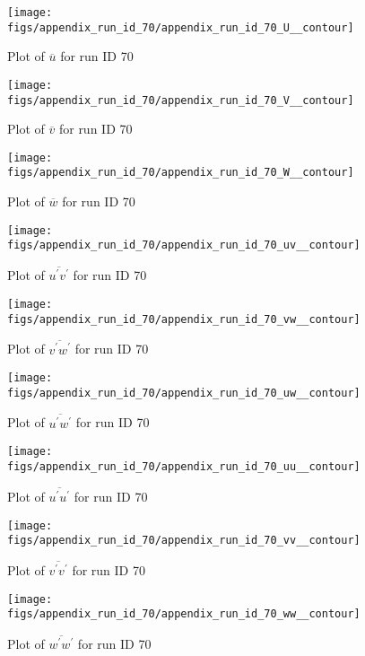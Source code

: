 \begin{figure}[H]
\centering
\texttt{[image: figs/appendix\_run\_id\_70/appendix\_run\_id\_70\_U\_\_contour]}
\caption{Plot of $\overline{u}$ for run ID 70}
\label{fig:appendix_run_id_70_U__contour}
\end{figure}


\begin{figure}[H]
\centering
\texttt{[image: figs/appendix\_run\_id\_70/appendix\_run\_id\_70\_V\_\_contour]}
\caption{Plot of $\overline{v}$ for run ID 70}
\label{fig:appendix_run_id_70_V__contour}
\end{figure}


\begin{figure}[H]
\centering
\texttt{[image: figs/appendix\_run\_id\_70/appendix\_run\_id\_70\_W\_\_contour]}
\caption{Plot of $\overline{w}$ for run ID 70}
\label{fig:appendix_run_id_70_W__contour}
\end{figure}


\begin{figure}[H]
\centering
\texttt{[image: figs/appendix\_run\_id\_70/appendix\_run\_id\_70\_uv\_\_contour]}
\caption{Plot of $\overline{u^\prime v^\prime}$ for run ID 70}
\label{fig:appendix_run_id_70_uv__contour}
\end{figure}


\begin{figure}[H]
\centering
\texttt{[image: figs/appendix\_run\_id\_70/appendix\_run\_id\_70\_vw\_\_contour]}
\caption{Plot of $\overline{v^\prime w^\prime}$ for run ID 70}
\label{fig:appendix_run_id_70_vw__contour}
\end{figure}


\begin{figure}[H]
\centering
\texttt{[image: figs/appendix\_run\_id\_70/appendix\_run\_id\_70\_uw\_\_contour]}
\caption{Plot of $\overline{u^\prime w^\prime}$ for run ID 70}
\label{fig:appendix_run_id_70_uw__contour}
\end{figure}


\begin{figure}[H]
\centering
\texttt{[image: figs/appendix\_run\_id\_70/appendix\_run\_id\_70\_uu\_\_contour]}
\caption{Plot of $\overline{u^\prime u^\prime}$ for run ID 70}
\label{fig:appendix_run_id_70_uu__contour}
\end{figure}


\begin{figure}[H]
\centering
\texttt{[image: figs/appendix\_run\_id\_70/appendix\_run\_id\_70\_vv\_\_contour]}
\caption{Plot of $\overline{v^\prime v^\prime}$ for run ID 70}
\label{fig:appendix_run_id_70_vv__contour}
\end{figure}


\begin{figure}[H]
\centering
\texttt{[image: figs/appendix\_run\_id\_70/appendix\_run\_id\_70\_ww\_\_contour]}
\caption{Plot of $\overline{w^\prime w^\prime}$ for run ID 70}
\label{fig:appendix_run_id_70_ww__contour}
\end{figure}



